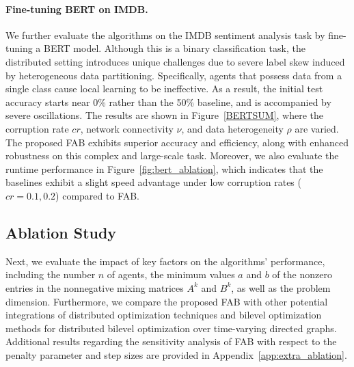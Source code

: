 \documentclass{article}
\theoremstyle{plain}
\theoremstyle{definition}
\theoremstyle{remark}
\begin{document}
\paragraph{Fine-tuning BERT on IMDB.}
We further evaluate the algorithms on the IMDB sentiment analysis task by fine-tuning a BERT model. Although this is a binary classification task, the distributed setting introduces unique challenges due to severe label skew induced by heterogeneous data partitioning. Specifically, agents that possess data from a single class cause local learning to be ineffective. As a result, the initial test accuracy starts near 0\% rather than the 50\% baseline, and is accompanied by severe oscillations. 
The results are shown in Figure~\ref{BERTSUM}, where the corruption rate $cr$, network connectivity $\nu$, and data heterogeneity $\rho$ are varied. The proposed FAB exhibits superior accuracy and efficiency, along with enhanced robustness on this complex and large-scale task. Moreover, we also evaluate the runtime performance in Figure~\ref{fig:bert_ablation}, which indicates that the baselines exhibit a slight speed advantage under low corruption rates ($cr=0.1, 0.2$) compared to FAB.


\subsection{Ablation Study}

Next, we evaluate the impact of key factors on the algorithms’ performance, including the number $n$ of agents, the minimum values $a$ and $b$ of the nonzero entries in the nonnegative mixing matrices $A^k$ and $B^k$, as well as the problem dimension.
Furthermore, we compare the proposed FAB with other potential integrations of distributed optimization techniques and bilevel optimization methods for distributed bilevel optimization over time-varying directed graphs. 
Additional results regarding the sensitivity analysis of FAB with respect to the penalty parameter and step sizes are provided in Appendix~\ref{app:extra_ablation}.
\end{document}
